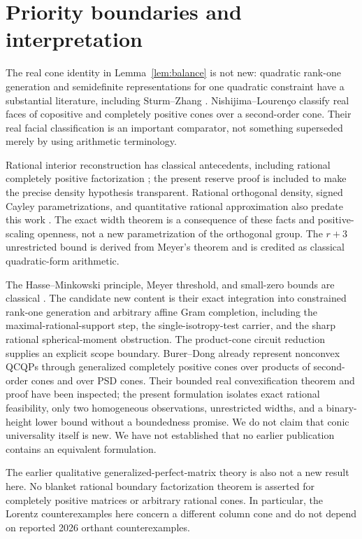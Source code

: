\section{Priority boundaries and interpretation}
The real cone identity in Lemma~\ref{lem:balance} is not new: quadratic rank-one generation and semidefinite representations for one quadratic constraint have a substantial literature, including Sturm--Zhang \cite{SZ}. Nishijima--Louren\c{c}o \cite{NL} classify real faces of copositive and completely positive cones over a second-order cone. Their real facial classification is an important comparator, not something superseded merely by using arithmetic terminology.

Rational interior reconstruction has classical antecedents, including rational completely positive factorization \cite{DSV}; the present reserve proof is included to make the precise density hypothesis transparent. Rational orthogonal density, signed Cayley parametrizations, and quantitative rational approximation also predate this work \cite{Schmutz,LO,TWZ}. The exact width theorem is a consequence of these facts and positive-scaling openness, not a new parametrization of the orthogonal group. The $r+3$ unrestricted bound is derived from Meyer's theorem and is credited as classical quadratic-form arithmetic.

The Hasse--Minkowski principle, Meyer threshold, and small-zero bounds are classical \cite{CasselsBook,CasselsSmall,Dietmann}. The candidate new content is their exact integration into constrained rank-one generation and arbitrary affine Gram completion, including the maximal-rational-support step, the single-isotropy-test carrier, and the sharp rational spherical-moment obstruction. The product-cone circuit reduction supplies an explicit scope boundary. Burer--Dong \cite{BD} already represent nonconvex QCQPs through generalized completely positive cones over products of second-order cones and over PSD cones. Their bounded real convexification theorem and proof have been inspected; the present formulation isolates exact rational feasibility, only two homogeneous observations, unrestricted widths, and a binary-height lower bound without a boundedness promise. We do not claim that conic universality itself is new. We have not established that no earlier publication contains an equivalent formulation.

The earlier qualitative generalized-perfect-matrix theory \cite{OS} is also not a new result here. No blanket rational boundary factorization theorem is asserted for completely positive matrices or arbitrary rational cones. In particular, the Lorentz counterexamples here concern a different column cone and do not depend on reported 2026 orthant counterexamples.

